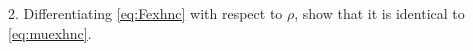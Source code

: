\documentclass[12pt]{book}
\begin{document}
2. Differentiating \eqref{eq:Fexhnc} with respect to $\rho$,
show that it is identical to \eqref{eq:muexhnc}.


%
%
%





\end{document}
